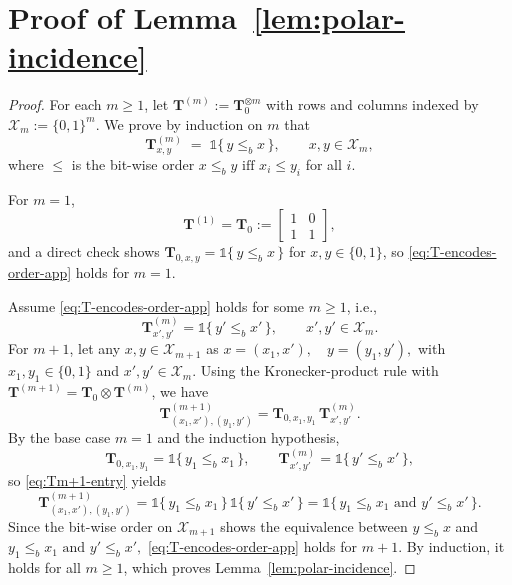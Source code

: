 \documentclass[onecolumn]{IEEEtran} %
\newcommand{\1}{\mathbbm{1}}
\theoremstyle{boldremark}
\newcommand{\bT}{\mathbf{T}}
\begin{document}



\section{Proof of Lemma~\ref{lem:polar-incidence}}
\label{APP_proof_lem:polar-incidence}

\begin{proof}
For each \(m\ge 1\), let
\(
  \mathbf{T}^{(m)} := \bT_0^{\otimes m}
\)
with rows and columns indexed by \(\mathcal{X}_m:=\{0,1\}^m\).
We prove by induction on \(m\) that
\begin{equation}\label{eq:T-encodes-order-app}
  \mathbf{T}^{(m)}_{x,y}
  \;=\;
  \mathds{1}\{\,y \le_b x\,\},
  \qquad x,y\in\mathcal{X}_m,
\end{equation}
where \(\le\) is the bit-wise order \(x\le_b y \mbox{ iff } x_i\le y_i\) for all \(i\).

For \(m=1\),
\[
  \mathbf{T}^{(1)} = \bT_0
  :=
  \begin{bmatrix}
    1 & 0\\
    1 & 1
  \end{bmatrix},
\]
and a direct check shows
\(
  \bT_{0,x,y}=\mathds{1}\{\,y\le_b x\,\}
\)
for \(x,y\in\{0,1\}\), so \eqref{eq:T-encodes-order-app} holds for \(m=1\).

Assume \eqref{eq:T-encodes-order-app} holds for some \(m\ge 1\), i.e.,
\[
  \mathbf{T}^{(m)}_{x',y'}
  = \mathds{1}\{\,y'\le_b x'\,\},
  \qquad x',y'\in\mathcal{X}_m.
\]
For \(m+1\), let any \(x,y\in\mathcal{X}_{m+1}\) as $  x=(x_1,x'),\quad y=(y_1,y'),$ with \(x_1,y_1\in\{0,1\}\) and \(x',y'\in\mathcal{X}_m\).
Using the Kronecker-product rule with \(\mathbf{T}^{(m+1)}=\bT_0\otimes \mathbf{T}^{(m)}\), we have
\begin{equation}\label{eq:Tm+1-entry}
  \mathbf{T}^{(m+1)}_{(x_1,x'),(y_1,y')}
  = \bT_{0,x_1,y_1}\,\mathbf{T}^{(m)}_{x',y'}.
\end{equation}
By the base case \(m=1\) and the induction hypothesis,
\[
  \bT_{0,{x_1,y_1}}=\mathds{1}\{\,y_1\le_b x_1\,\},
  \qquad
  \mathbf{T}^{(m)}_{x',y'}=\mathds{1}\{\,y'\le_b x'\,\},
\]
so \eqref{eq:Tm+1-entry} yields
\[
  \mathbf{T}^{(m+1)}_{(x_1,x'),(y_1,y')}
  = \mathds{1}\{\,y_1\le_b x_1\,\}\,\mathds{1}\{\,y'\le_b x'\,\}
  = \mathds{1}\bigl\{\,y_1\le_b x_1 \text{ and } y'\le_b x'\,\bigr\}.
\]
Since the bit-wise order on \(\mathcal{X}_{m+1}\) shows the equivalence between $
  y \le_b x$ and $   y_1\le_b x_1 \text{ and } y'\le_b x',$
\eqref{eq:T-encodes-order-app} holds for \(m+1\).
By induction, it holds for all \(m\ge 1\), which proves Lemma~\ref{lem:polar-incidence}.
\end{proof}
\end{document}
